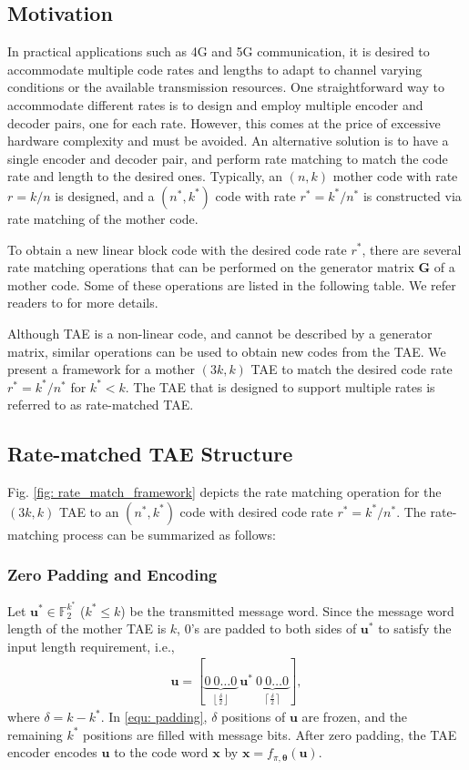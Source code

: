 \documentclass [PhD] {uclathes}
\begin{document}
    \subsection{Motivation}
    In practical applications such as 4G and 5G communication, it is desired to accommodate multiple code rates and lengths to adapt to channel varying conditions or the available transmission resources. One straightforward way to accommodate different rates is to design and employ multiple encoder and decoder pairs, one for each rate. However, this comes at the price of excessive hardware complexity and must be avoided. An alternative solution is to have a single encoder and decoder pair, and perform rate matching to match the code rate and length to the desired ones. Typically, an $(n,k)$ mother code with rate $r=k/n$ is designed, and a $(n^*,k^*)$ code with rate $r^*=k^*/n^*$ is constructed via rate matching of the mother code.
   
   
   To obtain a new linear block code with the desired code rate $r^*$, there are several rate matching operations that can be performed on the generator matrix $\mathbf{G}$ of a mother code. Some of these operations are listed in the following table. We refer readers to \cite[Chapter 3.6]{blahut2003algebraic} for more details.

   
  
Although TAE is a non-linear code, and cannot be described by a generator matrix, similar operations can be used to obtain new codes from the TAE. We present a framework for a mother $(3k,k)$ TAE to match the desired code rate $r^*={k^*}/{n^*}$ for $k^*<k$. The TAE that is designed to support multiple rates is referred to as rate-matched TAE. 

\subsection{Rate-matched TAE Structure}\label{sec: rm_tae_structure}
Fig. \ref{fig: rate_match_framework} depicts the rate matching operation for the $(3k,k)$ TAE to an $(n^*,k^*)$ code with desired code rate $r^*={k^*}/{n^*}$. The rate-matching process can be summarized as follows:

\subsubsection{Zero Padding and Encoding} Let $\mathbf{u}^*\in\mathbb{F}_2^{k^*}$ ($k^*\leq k$) be the transmitted message word. Since the message word length of the mother TAE is $k$, $0$'s are padded to both sides of $\mathbf{u^*}$ to satisfy the input length requirement, i.e.,
\begin{align}\label{equ: padding}
    \mathbf{u}=[\underbrace{0~0\ldots 0}_{\left\lfloor\frac{\delta}{2}\right\rfloor }~\mathbf{u^*}~ \underbrace{0~0\ldots 0}_{\left\lceil\frac{\delta}{2}\right\rceil } ],
\end{align}
where $\delta=k-k^*$. In \eqref{equ: padding}, $\delta$ positions of $\mathbf{u}$ are frozen, and the remaining $k^*$ positions are filled with message bits. After zero padding, the TAE encoder encodes $\mathbf{u}$ to the code word $\mathbf{x}$ by $\mathbf{x}=f_{\pi,{\boldsymbol\theta}}(\mathbf{u})$.
\end{document}
